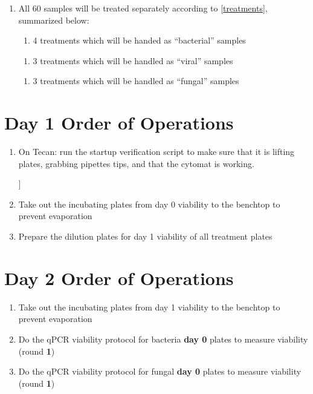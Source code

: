 \documentclass{article}
\newcounter{comments}
\newcommand{\amogh}[1]{{\addtocounter{comments}{1}}{\color{red}{[\textbf{TODO Amogh \thecomments :}\ #1}]}}
\begin{document}
\begin{enumerate}
    \item All 60 samples will be treated separately according to \ref{treatments}, summarized below:
    
    \begin{enumerate}
        \item 4 treatments which will be handed as “bacterial” samples
    \end{enumerate}
    \begin{enumerate}
        \item 3 treatments which will be handled as “viral” samples
    \end{enumerate}
    \begin{enumerate}
        \item 3 treatments which will be handled as “fungal” samples
    \end{enumerate}
\end{enumerate}

\section*{Day 1 Order of Operations} \label{day1instructions}
\begin{enumerate}
    \item On Tecan: run the startup verification script to make sure that it is lifting plates, grabbing pipettes tips, and that the cytomat is working. \amogh{}
    \item Take out the incubating plates from day 0 viability to the benchtop to prevent evaporation
    \item Prepare the dilution plates for day 1 viability of all treatment plates
\end{enumerate}

\section*{Day 2 Order of Operations} \label{day1instructions}
\begin{enumerate}
    \item Take out the incubating plates from day 1 viability to the benchtop to prevent evaporation
    \item Do the qPCR viability protocol for bacteria \textbf{day 0} plates to measure viability (round \textbf{1})
    \item Do the qPCR viability protocol for fungal \textbf{day 0} plates to measure viability (round \textbf{1})
\end{enumerate}
\end{document}
